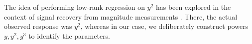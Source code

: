 The idea of performing low-rank regression on $y^2$ has been explored
in the context of signal recovery from magnitude measurements
\cite{candes11phaselift,ohlsson12phase}.
There, the actual observed response was $y^2$,
whereas in our case, we deliberately construct powers $y,y^2,y^3$
to identify the parameters.



